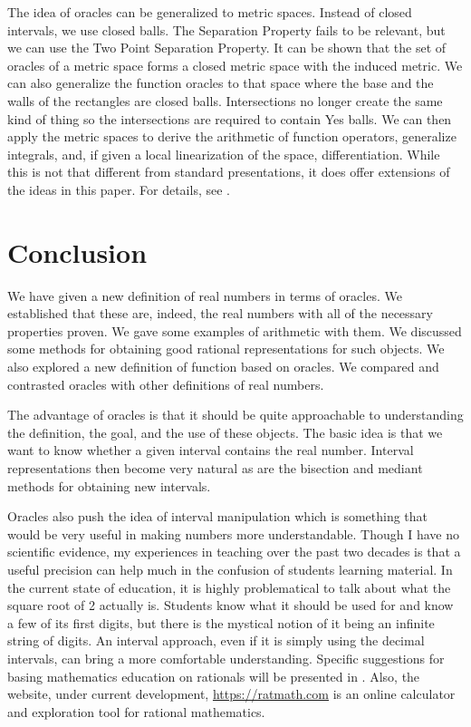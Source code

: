 \documentclass[12pt]{article}
\theoremstyle{remark}
\begin{document}
The idea of oracles can be generalized to metric spaces. Instead of closed intervals, we use closed balls. The Separation Property fails to be relevant, but we can use the Two Point Separation Property. It can be shown that the set of oracles of a metric space forms a closed metric space with the induced metric.  We can also generalize the function oracles to that space where the base and the walls of the rectangles are closed balls. Intersections no longer create the same kind of thing so the intersections are required to contain Yes balls. We can then apply the metric spaces to derive the arithmetic of function operators, generalize integrals, and, if given a local linearization of the space, differentiation. While this is not that different from standard presentations, it does offer extensions of the ideas in this paper. For details, see \cite{taylor23metric}. 

\section{Conclusion}

We have given a new definition of real numbers in terms of oracles. We established that these are, indeed, the real numbers with all of the necessary properties proven. We gave some examples of arithmetic with them. We discussed some methods for obtaining good rational representations for such objects. We also explored a new definition of function based on oracles. We compared and contrasted oracles with other definitions of real numbers. 

The advantage of oracles is that it should be quite approachable to understanding the definition, the goal, and the use of these objects. The basic idea is that we want to know whether a given interval contains the real number. Interval representations then become very natural as are the bisection and mediant methods for obtaining new intervals. 

Oracles also push the idea of interval manipulation which is something that would be very useful in making numbers more understandable. Though I have no scientific evidence, my experiences in teaching over the past two decades is that a useful precision can help much in the confusion of students learning material. In the current state of education, it is highly problematical to talk about what the square root of 2 actually is. Students know what it should be used for and know a few of its first digits, but there is the mystical notion of it being an infinite string of digits. An interval approach, even if it is simply using the decimal intervals, can bring a more comfortable understanding. Specific suggestions for basing mathematics education on rationals will be presented in \cite{taylor23edu}. Also, the website, under current development, \url{https://ratmath.com} is an online calculator and exploration tool for rational mathematics. 
\end{document}
